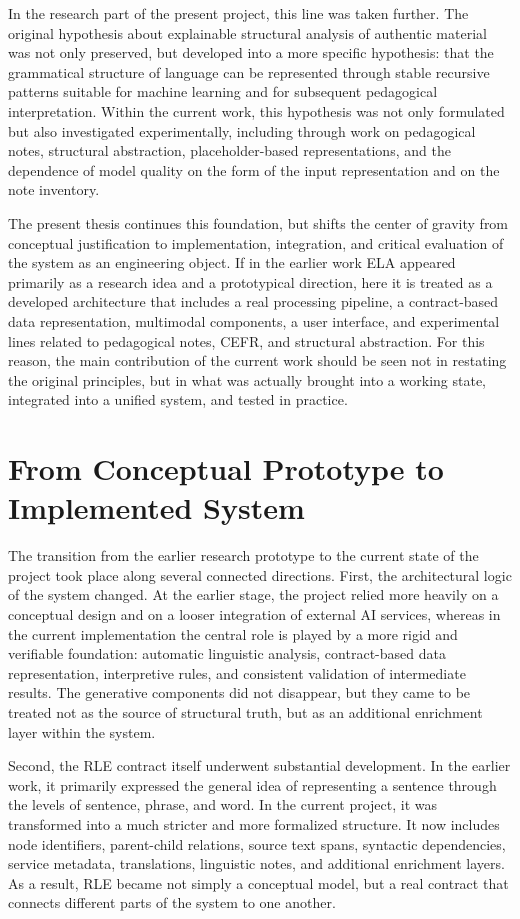 \documentclass[12pt,a4paper,oneside]{report}
\begin{document}
In the research part of the present project, this line was taken further. The original hypothesis about explainable structural analysis of authentic material was not only preserved, but developed into a more specific hypothesis: that the grammatical structure of language can be represented through stable recursive patterns suitable for machine learning and for subsequent pedagogical interpretation. Within the current work, this hypothesis was not only formulated but also investigated experimentally, including through work on pedagogical notes, structural abstraction, placeholder-based representations, and the dependence of model quality on the form of the input representation and on the note inventory.

The present thesis continues this foundation, but shifts the center of gravity from conceptual justification to implementation, integration, and critical evaluation of the system as an engineering object. If in the earlier work ELA appeared primarily as a research idea and a prototypical direction, here it is treated as a developed architecture that includes a real processing pipeline, a contract-based data representation, multimodal components, a user interface, and experimental lines related to pedagogical notes, CEFR, and structural abstraction. For this reason, the main contribution of the current work should be seen not in restating the original principles, but in what was actually brought into a working state, integrated into a unified system, and tested in practice.

\section{From Conceptual Prototype to Implemented System}
The transition from the earlier research prototype to the current state of the project took place along several connected directions. First, the architectural logic of the system changed. At the earlier stage, the project relied more heavily on a conceptual design and on a looser integration of external AI services, whereas in the current implementation the central role is played by a more rigid and verifiable foundation: automatic linguistic analysis, contract-based data representation, interpretive rules, and consistent validation of intermediate results. The generative components did not disappear, but they came to be treated not as the source of structural truth, but as an additional enrichment layer within the system.

Second, the RLE contract itself underwent substantial development. In the earlier work, it primarily expressed the general idea of representing a sentence through the levels of sentence, phrase, and word. In the current project, it was transformed into a much stricter and more formalized structure. It now includes node identifiers, parent-child relations, source text spans, syntactic dependencies, service metadata, translations, linguistic notes, and additional enrichment layers. As a result, RLE became not simply a conceptual model, but a real contract that connects different parts of the system to one another.
\end{document}
